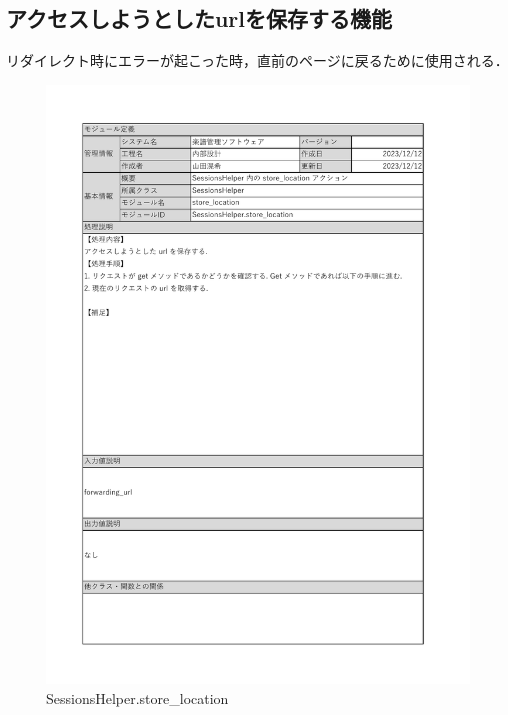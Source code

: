 \subsection*{アクセスしようとしたurlを保存する機能}
リダイレクト時にエラーが起こった時，直前のページに戻るために使用される．
\begin{figure}[H]
    \centering
    \includegraphics[scale=0.5]{img/Helper/SessionsHelper_store_location.pdf}
    \caption{SessionsHelper.store\_location}
\end{figure}
\clearpage

